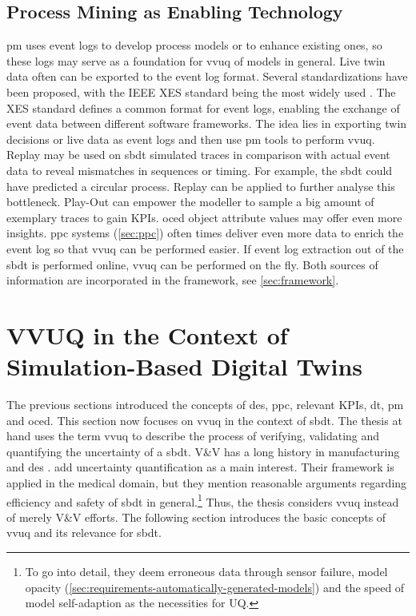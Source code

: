 \subsection{Process Mining as Enabling Technology}
\label{sec:process-mining-enabling-technology}

\gls{pm} uses event logs to develop process models or to enhance existing ones, so these logs may serve as a foundation for \gls{vvuq} of models in general. Live twin data often can be exported to the event log format. Several standardizations have been proposed, with the IEEE XES standard being the most widely used \autocite{van2016data}. The XES standard defines a common format for event logs, enabling the exchange of event data between different software frameworks. The idea lies in exporting twin decisions or live data as event logs and then use \gls{pm} tools to perform \gls{vvuq}.
Replay may be used on \gls{sbdt} simulated traces in comparison with actual event data to reveal mismatches in sequences or timing. For example, the \gls{sbdt} could have predicted a circular process. Replay can be applied to further analyse this bottleneck. Play-Out can empower the modeller to sample a big amount of exemplary traces to gain KPIs. \gls{oced} object attribute values may offer even more insights.
\gls{ppc} systems (\autoref{sec:ppc}) often times deliver even more data to enrich the event log so that \gls{vvuq} can be performed easier. If event log extraction out of the \gls{sbdt} is performed online, \gls{vvuq} can be performed on the fly. Both sources of information are incorporated in the framework, see \autoref{sec:framework}.

\section{VVUQ in the Context of Simulation-Based Digital Twins}
\label{sec:vvuq-sbdt}

The previous sections introduced the concepts of \gls{des}, \gls{ppc}, relevant KPIs, \gls{dt}, \gls{pm} and \gls{oced}. This section now focuses on \gls{vvuq} in the context of \gls{sbdt}. The thesis at hand uses the term \gls{vvuq} to describe the process of verifying, validating and quantifying the uncertainty of a \gls{sbdt}. V\&V has a long history in manufacturing and \gls{des} \autocite{Bitencourt2023}. \Textcite{sel2025survey} add uncertainty quantification as a main interest. Their framework is applied in the medical domain, but they mention reasonable arguments regarding efficiency and safety of \gls{sbdt} in general.\footnote{To go into detail, they deem erroneous data through sensor failure, model opacity (\autoref{sec:requirements-automatically-generated-models}) and the speed of model self-adaption as the necessities for UQ.} Thus, the thesis considers \gls{vvuq} instead of merely V\&V efforts. The following section introduces the basic concepts of \gls{vvuq} and its relevance for \gls{sbdt}.


